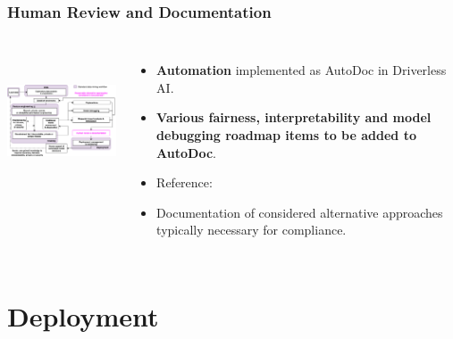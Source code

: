 \documentclass[11pt,
               aspectratio=169,
               hyperref={colorlinks}
               ]{beamer}
\begin{document}
		\begin{frame}
		
			\frametitle{Human Review and Documentation}		
			
			\begin{columns}
	
				\centering
				\includegraphics[height=120pt]{img/hr.png}
				
				\vspace{-5pt}
				\begin{itemize}
					\item \textbf{Automation} implemented as AutoDoc in Driverless AI.
					\item \textbf{Various fairness, interpretability and model debugging roadmap items to be added to AutoDoc}.
					\item Reference: 
					\item Documentation of considered alternative approaches typically necessary for compliance.
				\end{itemize}
				
			\end{columns}
		
		\end{frame}

	\section{Deployment}
\end{document}
